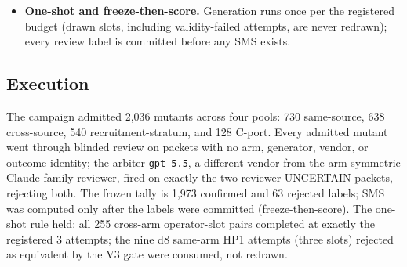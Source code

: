 \documentclass[manuscript,screen,review]{acmart}
\begin{document}
\begin{itemize}
  the verdict. \emph{v1.2}: after a gateway
  quota event, the Claude-family roles moved to the session harness;
  non-Anthropic generation and the arbiter stayed on the gateway. The change
  is arm-symmetric (one reviewer sees both arms' blinded packets), so it
  cannot bias \(\Delta\delta\); the registered extra rich-class slots
  relocated into a dedicated harness recruitment stratum over the 15 rich
  PUTs (registered floor \(m_s = 11\), executed as 36 slots per PUT) with
  pooling pre-declared. Neither amendment moves a threshold, estimand,
  decision rule, or seed, and both precede any outcome, so neither can be
  selection on the response.
\item
  \textbf{One-shot and freeze-then-score.} Generation runs once per the
  registered budget (drawn slots, including validity-failed attempts, are
  never redrawn); every review label is committed before any SMS exists.
\end{itemize}

\subsection{Execution}\label{study4-execution}

The campaign admitted 2{,}036 mutants across four pools: 730 same-source, 638
cross-source, 540 recruitment-stratum, and 128 C-port. Every admitted mutant
went through blinded review on packets with no arm, generator, vendor, or
outcome identity; the arbiter \texttt{gpt-5.5}, a different vendor from the
arm-symmetric Claude-family reviewer, fired on exactly the two
reviewer-UNCERTAIN packets, rejecting both. The frozen tally is 1{,}973
confirmed and 63 rejected labels; SMS was computed only after the labels were
committed (freeze-then-score). The one-shot rule held: all 255 cross-arm
operator-slot pairs completed at exactly the registered 3 attempts; the nine
d8 same-arm HP1 attempts (three slots) rejected as equivalent by the V3 gate
were consumed, not redrawn.
\end{document}
